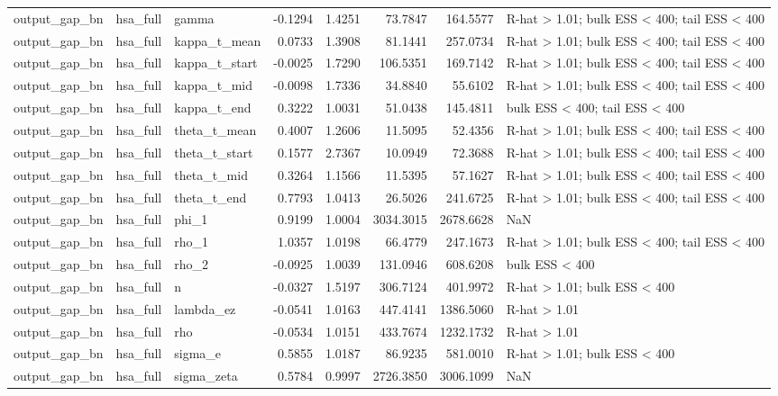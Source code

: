 \begin{tabular}{lllrrrrl}
output\_gap\_bn & hsa\_full & gamma & -0.1294 & 1.4251 & 73.7847 & 164.5577 & R-hat > 1.01; bulk ESS < 400; tail ESS < 400 \\
output\_gap\_bn & hsa\_full & kappa\_t\_mean & 0.0733 & 1.3908 & 81.1441 & 257.0734 & R-hat > 1.01; bulk ESS < 400; tail ESS < 400 \\
output\_gap\_bn & hsa\_full & kappa\_t\_start & -0.0025 & 1.7290 & 106.5351 & 169.7142 & R-hat > 1.01; bulk ESS < 400; tail ESS < 400 \\
output\_gap\_bn & hsa\_full & kappa\_t\_mid & -0.0098 & 1.7336 & 34.8840 & 55.6102 & R-hat > 1.01; bulk ESS < 400; tail ESS < 400 \\
output\_gap\_bn & hsa\_full & kappa\_t\_end & 0.3222 & 1.0031 & 51.0438 & 145.4811 & bulk ESS < 400; tail ESS < 400 \\
output\_gap\_bn & hsa\_full & theta\_t\_mean & 0.4007 & 1.2606 & 11.5095 & 52.4356 & R-hat > 1.01; bulk ESS < 400; tail ESS < 400 \\
output\_gap\_bn & hsa\_full & theta\_t\_start & 0.1577 & 2.7367 & 10.0949 & 72.3688 & R-hat > 1.01; bulk ESS < 400; tail ESS < 400 \\
output\_gap\_bn & hsa\_full & theta\_t\_mid & 0.3264 & 1.1566 & 11.5395 & 57.1627 & R-hat > 1.01; bulk ESS < 400; tail ESS < 400 \\
output\_gap\_bn & hsa\_full & theta\_t\_end & 0.7793 & 1.0413 & 26.5026 & 241.6725 & R-hat > 1.01; bulk ESS < 400; tail ESS < 400 \\
output\_gap\_bn & hsa\_full & phi\_1 & 0.9199 & 1.0004 & 3034.3015 & 2678.6628 & NaN \\
output\_gap\_bn & hsa\_full & rho\_1 & 1.0357 & 1.0198 & 66.4779 & 247.1673 & R-hat > 1.01; bulk ESS < 400; tail ESS < 400 \\
output\_gap\_bn & hsa\_full & rho\_2 & -0.0925 & 1.0039 & 131.0946 & 608.6208 & bulk ESS < 400 \\
output\_gap\_bn & hsa\_full & n & -0.0327 & 1.5197 & 306.7124 & 401.9972 & R-hat > 1.01; bulk ESS < 400 \\
output\_gap\_bn & hsa\_full & lambda\_ez & -0.0541 & 1.0163 & 447.4141 & 1386.5060 & R-hat > 1.01 \\
output\_gap\_bn & hsa\_full & rho & -0.0534 & 1.0151 & 433.7674 & 1232.1732 & R-hat > 1.01 \\
output\_gap\_bn & hsa\_full & sigma\_e & 0.5855 & 1.0187 & 86.9235 & 581.0010 & R-hat > 1.01; bulk ESS < 400 \\
output\_gap\_bn & hsa\_full & sigma\_zeta & 0.5784 & 0.9997 & 2726.3850 & 3006.1099 & NaN \\

\end{tabular}
